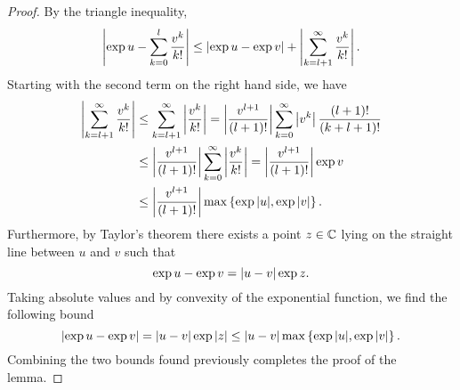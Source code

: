 \begin{proof}
    By the triangle inequality,
    \begin{equation*}
        \left|\exp{u} - \sum_{k=0}^l \frac{v^k}{k!}\right| \leq \left|\exp{u} - \exp{v}\right| + \left|\sum_{k=l+1}^\infty \frac{v^k}{k!}\right|.
    \end{equation*}
    Starting with the second term on the right hand side, we have
    \begin{align*}
        \left|\sum_{k=l+1}^\infty \frac{v^k}{k!}\right| 
        & \leq \sum_{k=l+1}^\infty \left|\frac{v^k}{k!}\right| 
        = \left|\frac{v^{l+1}}{(l+1)!}\right| \sum_{k=0}^\infty \left|v^k\right| \frac{(l+1)!}{(k + l + 1)!} \\
        & \leq \left|\frac{v^{l+1}}{(l+1)!}\right| \sum_{k=0}^\infty \left|\frac{v^k}{k!}\right|
        = \left|\frac{v^{l+1}}{(l+1)!}\right| \exp v\\
        &\leq \left|\frac{v^{l+1}}{(l+1)!}\right| \max \left\{ \exp{|u|}, \exp{|v|} \right\}.
    \end{align*}
    Furthermore, by Taylor's theorem there exists a point $z \in \mathbb{C}$ lying on the straight line between $u$ and $v$ such that
    \begin{equation*}
        \exp u - \exp v = \left|u - v\right| \exp z.
    \end{equation*}
    Taking absolute values and by convexity of the exponential function, we find the following bound
    \begin{equation*}
        \left|\exp u - \exp v\right| = \left|u - v\right| \exp |z| \leq \left|u - v\right| \max \left\{ \exp{|u|}, \exp{|v|} \right\}.
    \end{equation*}
    Combining the two bounds found previously completes the proof of the lemma.
\end{proof}


